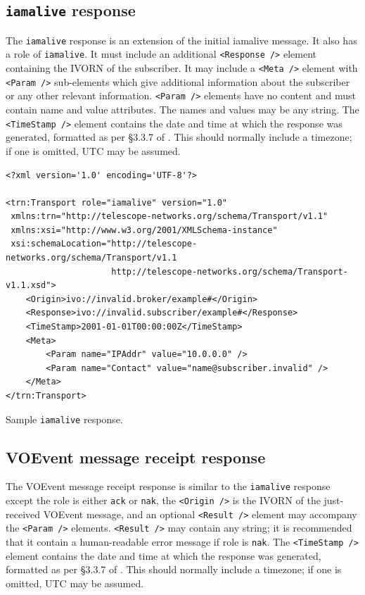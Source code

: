 \documentclass[a4paper,11pt]{ivoa}
\begin{document}
\subsection{\texttt{iamalive} response}
\label{sec:transport:iamaliveresponse}

The \texttt{iamalive} response is an extension of the initial iamalive
message. It also has a role of \texttt{iamalive}. It must include an
additional \texttt{<Response~/>} element containing the IVORN of the
subscriber.  It may include a \texttt{<Meta~/>} element with
\texttt{<Param~/>} sub-elements which give additional information about the
subscriber or any other relevant information. \texttt{<Param~/>} elements have
no content and must contain name and value attributes. The names and values
may be any string. The \texttt{<TimeStamp~/>} element contains the date and
time at which the response was generated, formatted as per \S3.3.7 of
\citet{Peterson:2012}. This should normally include a timezone; if one is
omitted, UTC may be assumed.

\begin{listing*}
\begin{verbatim}
<?xml version='1.0' encoding='UTF-8'?>

<trn:Transport role="iamalive" version="1.0"
 xmlns:trn="http://telescope-networks.org/schema/Transport/v1.1"
 xmlns:xsi="http://www.w3.org/2001/XMLSchema-instance"
 xsi:schemaLocation="http://telescope-networks.org/schema/Transport/v1.1
                     http://telescope-networks.org/schema/Transport-v1.1.xsd">
    <Origin>ivo://invalid.broker/example#</Origin>
    <Response>ivo://invalid.subscriber/example#</Response>
    <TimeStamp>2001-01-01T00:00:00Z</TimeStamp>
    <Meta>
        <Param name="IPAddr" value="10.0.0.0" />
        <Param name="Contact" value="name@subscriber.invalid" />
    </Meta>
</trn:Transport>
\end{verbatim}
\caption{Sample \texttt{iamalive} response.}
\label{lst:iamaliveresponse}
\end{listing*}

\subsection{VOEvent message receipt response}
\label{sec:transport:ack}

The VOEvent message receipt response is similar to the \texttt{iamalive}
response except the role is either \texttt{ack} or \texttt{nak}, the
\texttt{<Origin~/>} is the IVORN of the just-received VOEvent message, and an
optional \texttt{<Result~/>} element may accompany the \texttt{<Param~/>}
elements. \texttt{<Result~/>} may contain any string; it is recommended that
it contain a human-readable error message if role is \texttt{nak}. The
\texttt{<TimeStamp~/>} element contains the date and time at which the
response was generated, formatted as per \S3.3.7 of \citet{Peterson:2012}.
This should normally include a timezone; if one is omitted, UTC may be
assumed.
\end{document}
